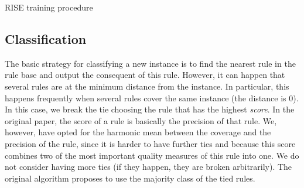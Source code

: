 \documentclass[a4paper]{article}
\begin{document}
\IncMargin{1em}
\SetAlCapSkip{1em}
\begin{algorithm}[htbp]
	\SetEndCharOfAlgoLine{}
	\caption{RISE training procedure}
	\label{alg:rise}
\end{algorithm}
\DecMargin{2em}

\subsection{Classification}

The basic strategy for classifying a new instance is to find the nearest rule in the rule base and output the consequent of this rule. However, it can happen that several rules are at the minimum distance from the instance. In particular, this happens frequently when several rules cover the same instance (the distance is 0). In this case, we break the tie choosing the rule that has the highest \emph{score}. In the original paper, the score of a rule is basically the precision of that rule. We, however, have opted for the harmonic mean between the coverage and the precision of the rule, since it is harder to have further ties and because this score combines two of the most important quality measures of this rule into one. We do not consider having more ties (if they happen, they are broken arbitrarily). The original algorithm proposes to use the majority class of the tied rules.
\end{document}
